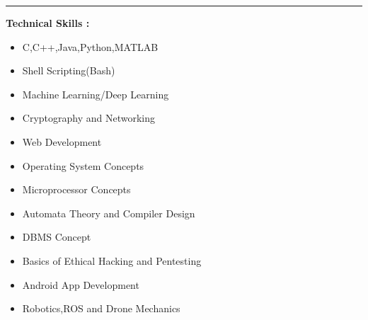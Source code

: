 \documentclass[11pt,a4paper]{article}
\begin{document}
\hfill
\hrule
\begin{multicols}{3}
	\begin{minipage}{0.15\paperwidth}
		\textbf{Technical\linebreak
			Skills : }
	\end{minipage}
	\begin{minipage}{0.35\paperwidth}
		\begin{flushleft}
			\begin{itemize}
				\item C,C++,Java,Python,MATLAB
				\item Shell Scripting(Bash)
				\item Machine Learning\//Deep Learning
				\item Cryptography and Networking
				\item Web Development
				\item Operating System Concepts
				\item Microprocessor Concepts
			\end{itemize}
		\end{flushleft}
	\end{minipage}
	\begin{flushright}
	\begin{minipage}{0.35\paperwidth}
		\begin{flushleft}
			\begin{itemize}
				\item Automata Theory and\linebreak
				 Compiler Design
				\item DBMS Concept
				\item Basics of Ethical\linebreak
				 Hacking and Pentesting
				\item Android App Development
				\item Robotics,ROS and\linebreak
				Drone Mechanics
			\end{itemize}
		\end{flushleft}
	\end{minipage}
	\end{flushright}
\end{multicols}
\end{document}
